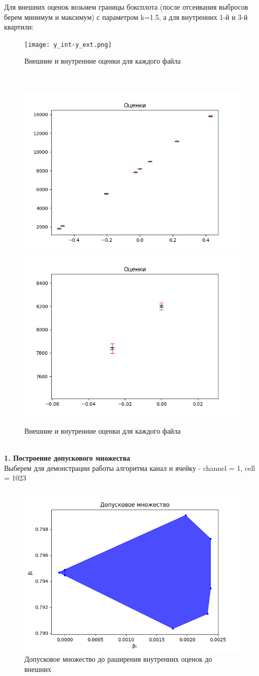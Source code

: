 \documentclass[10pt]{article}
\begin{document}
Для внешних оценок возьмем границы боксплота (после отсеивания выбросов берем минимум и максимум) с параметром k=1.5, а для внутренних 1-й и 3-й квартили:
\begin{figure}[h!]
    \centering
    \texttt{[image: y\_int-y\_ext.png]}
    \caption{Внешние и внутренние оценки для каждого файла}
\end{figure}\\
\begin{figure}[h!]
    \centering
    \includegraphics[width=0.45\linewidth]{visual_inners_externals_small.png}
        \includegraphics[width=0.45\linewidth]{visual_inners_externals_big.png}
    \caption{Внешние и внутренние оценки для каждого файла}
\end{figure}\\
\newpage
\hspace{-0.5cm}\textbf{1. Построение допускового множества}\\
Выберем для демонстрации работы алгоритма канал и ячейку - channel = 1, cell = 1023
\begin{figure}[h!]
    \centering
    \includegraphics[width=0.75\linewidth]{tol-before-alg.png}
    \caption{Допусковое множество до раширения внутренних оценок до внешних}
\end{figure}\\
\end{document}
